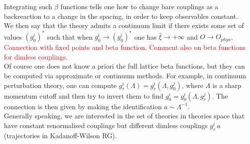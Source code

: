 Integrating such $\beta$ functions tells one how to change bare couplings as a backreaction to a change in the spacing, in order to keep observables constant. We then say that the theory admits a continuum limit if there exists some set of values $(g_0^i)^*$ such that when $g_0^i \to (g_0^i)^*$ one has $\hat \xi \to +\infty$ and $O \to O_{phys}$. \textcolor{red}{Connection with fixed points and beta function. Comment also on beta functions for dimless couplings}. \\
Of course one does not know a priori the full lattice beta functions, but they can be computed via approximate or continuum methods. For example, in continuum perturbation theory, one can compute $g_r^i(\Lambda) = g_r^i(\Lambda, g_0^j)$, where $\Lambda$ is a sharp momentum cutoff and then try to invert them to find $g_0^i = g_0^i(\Lambda, g_r^j)$. The connection is then given by making the identification $a \sim \Lambda^{-1}$. \\
Generally speaking, we are interested in the set of theories in theories space that have constant renormalised couplings but different dimless couplings $g_r^i \, a$ (trajectories in Kadanoff-Wilson RG).

